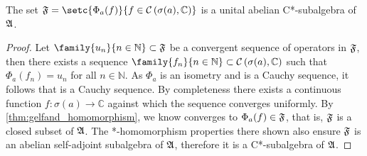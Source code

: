 \begin{corollary}
    The set \(\algebra{F} = \setc{\Phi_a(f)}{f \in \mathcal{C}\left(\sigma(a), \mathbb{C}\right)}\) is a unital abelian C*-subalgebra of \(\mathfrak{A}\).
\end{corollary}
\begin{proof}
    Let \(\family{u_n}{n \in \mathbb{N}} \subset \algebra{F}\) be a convergent sequence of operators in \(\mathfrak{F}\), then there exists a sequence \(\family{f_n}{n \in \mathbb{N}} \subset \mathcal{C}\left(\sigma(a), \mathbb{C}\right)\) such that \(\Phi_a(f_n) = u_n\) for all \(n \in \mathbb{N}\). As \(\Phi_a\) is an isometry and  is a Cauchy sequence, it follows that  is a Cauchy sequence. By completeness there exists a continuous function \(f : \sigma(a) \to \mathbb{C}\) against which the sequence  converges uniformly. By \cref{thm:gelfand_homomorphism}, we know  converges to \(\Phi_a(f) \in \mathfrak{F}\), that is, \(\mathfrak{F}\) is a closed subset of \(\mathfrak{A}\). The *-homomorphism properties there shown also ensure \(\mathfrak{F}\) is an abelian self-adjoint subalgebra of \(\mathfrak{A}\), therefore it is a C*-subalgebra of \(\mathfrak{A}\).
\end{proof}
